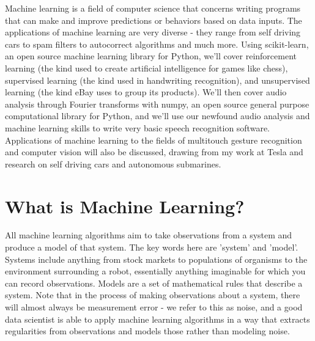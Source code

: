 \documentclass[11pt]{article}
\begin{document}
Machine learning is a field of computer science that concerns writing programs that can make and improve predictions or behaviors based on data inputs. The applications of machine learning are very diverse - they range from self driving cars to spam filters to autocorrect algorithms and much more. Using scikit-learn, an open source machine learning library for Python, we'll cover reinforcement learning (the kind used to create artificial intelligence for games like chess), supervised learning (the kind used in handwriting recognition), and unsupervised learning (the kind eBay uses to group its products). We'll then cover audio analysis through Fourier transforms with numpy, an open source general purpose computational library for Python, and we'll use our newfound audio analysis and machine learning skills to write very basic speech recognition software. Applications of machine learning to the fields of multitouch gesture recognition and computer vision will also be discussed, drawing from my work at Tesla and research on self driving cars and autonomous submarines.

\section{What is Machine Learning?}
All machine learning algorithms aim to take observations from a system and produce a model of that system. The key words here are 'system' and 'model'. Systems include anything from stock markets to populations of organisms to the environment surrounding a robot, essentially anything imaginable for which you can record observations. Models are a set of mathematical rules that describe a system. Note that in the process of making observations about a system, there will almost always be measurement error - we refer to this as noise, and a good data scientist is able to apply machine learning algorithms in a way that extracts regularities from observations and models those rather than modeling noise.
\end{document}
